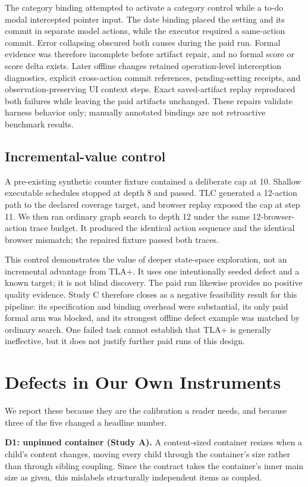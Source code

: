 \documentclass[acmsmall,screen,review,anonymous,nonacm]{acmart}
\begin{document}
The category binding attempted to activate a category control while a to-do modal intercepted pointer input. The date binding placed the setting and its commit in separate model actions, while the executor required a same-action commit. Error collapsing obscured both causes during the paid run. Formal evidence was therefore incomplete before artifact repair, and no formal score or score delta exists. Later offline changes retained operation-level interception diagnostics, explicit cross-action commit references, pending-setting receipts, and observation-preserving UI context steps. Exact saved-artifact replay reproduced both failures while leaving the paid artifacts unchanged. These repairs validate harness behavior only; manually annotated bindings are not retroactive benchmark results.

\subsection{Incremental-value control}
A pre-existing synthetic counter fixture contained a deliberate cap at 10. Shallow executable schedules stopped at depth 8 and passed. TLC generated a 12-action path to the declared coverage target, and browser replay exposed the cap at step 11. We then ran ordinary graph search to depth 12 under the same 12-browser-action trace budget. It produced the identical action sequence and the identical browser mismatch; the repaired fixture passed both traces.

This control demonstrates the value of deeper state-space exploration, not an incremental advantage from TLA+. It uses one intentionally seeded defect and a known target; it is not blind discovery. The paid run likewise provides no positive quality evidence. Study C therefore closes as a negative feasibility result for this pipeline: its specification and binding overhead were substantial, its only paid formal arm was blocked, and its strongest offline defect example was matched by ordinary search. One failed task cannot establish that TLA+ is generally ineffective, but it does not justify further paid runs of this design.

\section{Defects in Our Own Instruments}
We report these because they are the calibration a reader needs, and because three of the five changed a headline number.

\textbf{D1: unpinned container (Study A).} A content-sized container resizes when a child's content changes, moving every child through the container's size rather than through sibling coupling. Since the contract takes the container's inner main size as given, this mislabels structurally independent items as coupled.
\end{document}
